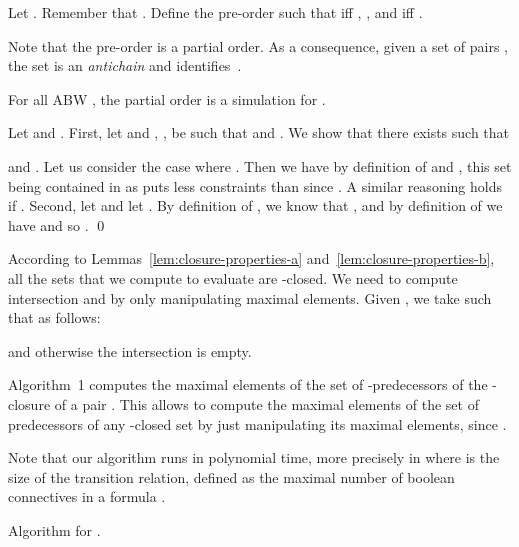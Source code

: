 \documentclass{LMCS}
\begin{document}
\begin{defi}\label{def:simulation-for-MH}
Let .
Remember that . 
Define the pre-order  such that  iff 
 ,  , and   iff . 
\end{defi}

Note that the pre-order  is a partial order. 
As a consequence, given a set of pairs , 
the set  is an \emph{antichain} and identifies~.

\begin{lem}\label{lem:alt-simulation-relation}
For all ABW , the partial order  is a simulation 
for .
\end{lem}

\proof 
Let  and
  .
  First, let  and , , 
  be such that 
  and
 .
 We show that there exists  such that 
 
 and . 
 Let us consider the case where . Then we have 
   by definition of  and 
  , 
  this set being contained in  as  puts less constraints than  since
  . A similar reasoning holds if . Second, let  and let . By definition of , we know
  that , and by definition of  we have 
   and so .
\qed

According to Lemmas~\ref{lem:closure-properties-a} and~\ref{lem:closure-properties-b}, 
all the sets that we compute to evaluate  are \mbox{-closed}.  
We need to compute intersection and  by only manipulating maximal elements. 
Given , we take  such
that  as follows:

and otherwise the intersection is empty. 

Algorithm~1 computes the maximal elements of the set of
-predecessors of the -clo\-sure of a pair
. This allows to compute the maximal elements of the
set of predecessors of any -closed set by just
manipulating its maximal elements, since .

Note that our algorithm runs in polynomial time, more precisely in  
where  is the size of the transition relation, defined as
the maximal number of boolean connectives in a formula .

\begin{algorithm}[!tbp]

  \flushleft
  \Begin { 
    \nl \;


    \nl  \label{alg:pre-alt-o}\;

    \nl \If{ \label{alg:pre-alt-simulation-test}}
	{
	   \nl  \label{alg:pre-alt-o-added}\; 		
	}

    \nl \If{ \label{alg:pre-alt-line-emtpiness-test}}
        {
	    \nl  \label{alg:pre-alt-s} \;
	    \nl  \label{alg:pre-alt-s-added}\;
	}


\nl \KwRet{}\; }\medskip

\caption{Algorithm for . \label{alg:pre-alt}}

\end{algorithm}
\end{document}
